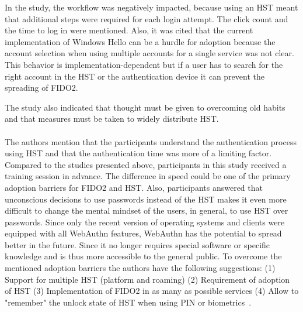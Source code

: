 \documentclass[runningheads]{llncs}
\begin{document}
In the study, the workflow was negatively impacted, because using an HST meant that additional steps were required for each login attempt. The click count and the time to log in were mentioned. Also, it was cited that the current implementation of Windows Hello can be a hurdle for adoption because the account selection when using multiple accounts for a single service was not clear. This behavior is implementation-dependent but if a user has to search for the right account in the HST or the authentication device it can prevent the spreading of FIDO2. 

The study also indicated that thought must be given to overcoming old habits and that measures must be taken to widely distribute HST.

\paragraph{}
The authors mention that the participants understand the authentication process using HST and that the authentication time was more of a limiting factor. Compared to the studies presented above, participants in this study received a training session in advance. The difference in speed could be one of the primary adoption barriers for FIDO2 and HST. Also, participants answered that unconscious decisions to use passwords instead of the HST makes it even more difficult to change the mental mindset of the users, in general, to use HST over passwords. Since only the recent version of operating systems and clients were equipped with all WebAuthn features, WebAuthn has the potential to spread better in the future. Since it no longer requires special software or specific knowledge and is thus more accessible to the general public. To overcome the mentioned adoption barriers the authors have the following suggestions: (1) Support for multiple HST (platform and roaming) (2) Requirement of adoption of HST (3) Implementation of FIDO2 in as many as possible services (4) Allow to "remember" the unlock state of HST when using PIN or biometrics~\cite{255646}.
\end{document}
